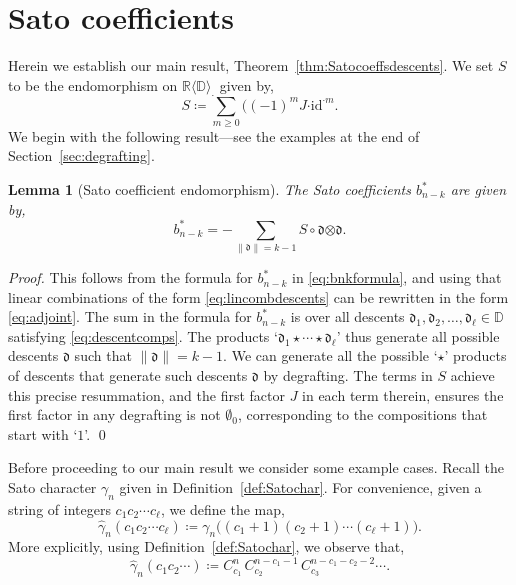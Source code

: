 \documentclass[5p,twocolumn]{elsarticle}
\newcommand*{\id}{{\mathrm{id}}}
\newcommand*{\R}{\mathbb R}
\newcommand*{\df}{\mathfrak d}
\newcommand*{\cendot}{\boldsymbol{\cdot}}
\newcommand*{\botimes}{\boldsymbol{\otimes}}
\newtheorem{lemma}[theorem]{Lemma}
\begin{document}
\section{Sato coefficients}\label{sec:Satocoeffs}       
Herein we establish our main result, Theorem~\ref{thm:Satocoeffsdescents}.  
We set $S$ to be the endomorphism on $\R\langle\mathbb D\rangle_{\cendot}$ given by,
\begin{equation*}
S\coloneqq \sum_{m\geqslant0}\bigl((-1)^{m}J\cendot\id^{\cendot m}.
\end{equation*}
%
We begin with the following result---see the examples at the end of Section~\ref{sec:degrafting}. 
%
\begin{lemma}[Sato coefficient endomorphism]\label{lemma:Satocoeffsviadescents}
  The Sato coefficients $b^\ast_{n-k}$ are given by,
  \begin{equation*}
    b^\ast_{n-k}=-\sum_{\|\df\|=k-1} S\circ\df\botimes\df.
  \end{equation*}
\end{lemma}
%
\begin{proof}
  This follows from the formula for $b_{n-k}^\ast$ in \eqref{eq:bnkformula}, and using that linear combinations of the form \eqref{eq:lincombdescents} can be rewritten in the form \eqref{eq:adjoint}.
  The sum in the formula for $b_{n-k}^\ast$ is over all descents $\df_1,\df_2,\ldots,\df_\ell\in\mathbb D$ satisfying \eqref{eq:descentcomps}. 
  The products `$\df_1\star\cdots\star\df_\ell$' thus generate all possible descents $\df$ such that $\|\df\|=k-1$.
  We can generate all the possible `$\star$' products of descents that generate such descents $\df$ by degrafting.
  The terms in $S$ achieve this precise resummation, and the first factor $J$ in each term therein, ensures the first factor in any degrafting is not $\emptyset_0$,
  corresponding to the compositions that start with `$1$'.
\qed
\end{proof}
%
Before proceeding to our main result we consider some example cases.
Recall the Sato character $\gamma_n$ given in Definition~\ref{def:Satochar}.
For convenience, given a string of integers $c_1c_2\cdots c_\ell$, we define the map,
\begin{equation*}
\hat{\gamma}_n(c_1c_2\cdots c_\ell)\coloneqq\gamma_n\bigl((c_1+1)(c_2+1)\cdots(c_\ell+1)\bigr).
\end{equation*}
More explicitly, using Definition~\ref{def:Satochar}, we observe that,
\begin{equation*}
     \hat{\gamma}_n(c_1c_2\cdots)\coloneqq C^n_{c_1}\,C^{n-c_1-1}_{c_2}\,C^{n-c_1-c_2-2}_{c_3}\cdots.
\end{equation*}
\end{document}
